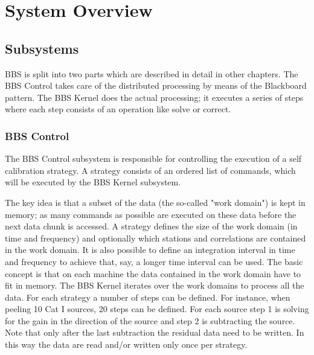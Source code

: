 \documentclass[10pt]{lofar}
\begin{document}
\pagebreak

\section{System Overview}
\label{sec:overview}

\subsection{Subsystems}
\label{subsec:subsystems}
BBS is split into two parts which are described in detail in other
chapters. The BBS Control takes care of the distributed processing by means of
the Blackboard pattern. The BBS Kernel does the actual processing; it executes
a series of steps where each step consists of an operation like solve or
correct.

\subsubsection{BBS Control}
\label{subsubsec:sys-control}

The BBS Control subsystem is responsible for controlling the execution of a
self calibration strategy. A strategy consists of an ordered list of commands,
which will be executed by the BBS Kernel subsystem.

The key idea is that a subset of the data (the so-called "work domain") is
kept in memory; as many commands as possible are executed on these data before
the next data chunk is accessed. A strategy defines the size of the work
domain (in time and frequency) and optionally which stations and correlations
are contained in the work domain. It is also possible to define an integration
interval in time and frequency to achieve that, say, a longer time interval
can be used. The basic concept is that on each machine the data contained in
the work domain have to fit in memory. The BBS Kernel iterates over the work
domains to process all the data.  For each strategy a number of steps can be
defined. For instance, when peeling 10 Cat I sources, 20 steps can be
defined. For each source step 1 is solving for the gain in the direction of
the source and step 2 is subtracting the source. Note that only after the last
subtraction the residual data need to be written.  In this way the data are
read and/or written only once per strategy.
\end{document}
